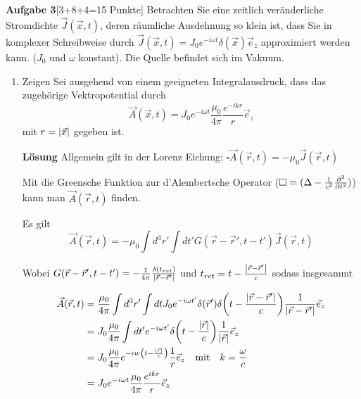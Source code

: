 \newpage
\setcounter{equation}{0}
\textbf{Aufgabe 3}\hfill[3+8+4=15 Punkte]
Betrachten Sie eine zeitlich veränderliche Stromdichte $\vec J(\vec x,t)$, 
deren
räumliche Ausdehnung so klein ist, dass Sie in komplexer Schreibweise durch
$\vec J(\vec x,t)=J_0 e^{-i\omega t}\delta(\vec x)\vec e_z$ approximiert
werden kann. ($J_0$ und $\omega$ konstant). Die Quelle befindet sich 
im Vakuum.
\begin{enumerate}[label=\alph*)]
  \item Zeigen Sei ausgehend von einem geeigneten Integralausdruck, dass
    das zugehörige Vektropotential durch
    \begin{equation*}
      \vec A(\vec x, t)
      =J_0 e^{-i\omega t}\frac{\mu_0}{4\pi}\frac{e^{-ikr}}{r}\vec e_z
    \end{equation*}
    mit $r=\abs{\vec x}$ gegeben ist.

    \textbf{Lösung} 
    Allgemein gilt in der Lorenz Eichung:
    $\square \vec A(\vec r,t)=-\mu_0 \vec J(\vec r,t)$

    Mit die Greensche Funktion zur d'Alembertsche Operator 
    ($\square=(\Delta-\frac{1}{c^2}\pdv[2]t)$) kann man $\vec A(\vec r,t)$ 
    finden.

    Es gilt 
    \begin{equation}
      \vec A(\vec r, t) = -\mu_0 \int d^3 r' \int dt' 
      G(\vec r - \vec r', t - t')\vec J(\vec r, t)
    \end{equation}

    \begin{center}
    Wobei $G(\vec r - \vec r', t-t')
    =-\frac{1}{4\pi} 
    \frac{\delta(t_{ret})}{\abs{\vec r- \vec r'}}$ und 
    $t_{ret}=t-\frac{\abs{\vec r -\vec r'}}{c}$ sodass insgesammt
    \end{center}

    \begin{equation}
      \begin{split}
      \vec A(\vec r, t)
      &=\frac{\mu_0}{4\pi} \int d^3 r' \int dt
      J_0e^{-i\omega t'}\delta(\vec r')
      \delta\qty(t-\frac{\abs{\vec r-\vec r'}}{c}) 
      \frac{1}{\abs{\vec r -\vec r'}} \vec{e}_z\\
      &=J_0 \frac{\mu_0}{4\pi}\int dt' e^{-i\omega t'}
      \delta\qty(t-\frac{\abs{\vec r}}{c})
      \frac{1}{\abs{\vec r}} \vec{e}_z\\
      &=J_0 \frac{\mu_0}{4\pi}e^{-iw\qty(t-\frac{\abs{\vec r}}{c})}
      \frac{1}{r} \vec{e}_z\quad\text{mit}\quad{k=\frac{\omega}{c}}\\
      &=J_0 e^{-i\omega t} \frac{\mu_0}{4\pi} \frac{e^{ikr}}{r}\vec{e}_z 
      \end{split}
    \end{equation}


\end{enumerate}
